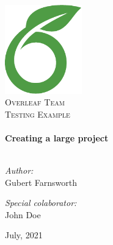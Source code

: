 \begin{titlepage}
\vbox{ }

\vbox{ }

\begin{center}
\includegraphics[width=0.25\textwidth]{./sections/img/overleaf-logo}\\[1cm]
\textsc{\LARGE Overleaf Team}\\[1.5cm]
\textsc{\Large Testing Example}\\[0.5cm]

\vbox{ }
\HRule \\[0.4cm]
{ \huge \bfseries Creating a large project}\\[0.4cm]
\HRule \\[1.5cm]
\begin{minipage}{0.4\textwidth}
\begin{flushleft} \large
\emph{Author:}\\
Gubert Farnsworth
\end{flushleft}
\end{minipage}
\begin{minipage}{0.4\textwidth}
\begin{flushright} \large
\emph{Special colaborator:} \\
John Doe
\end{flushright}
\end{minipage}
\vfill
{\large July, 2021}
\end{center}
\end{titlepage}
